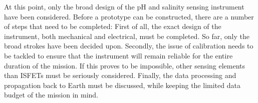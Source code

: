 \noindent
At this point, only the broad design of the pH and salinity sensing instrument have been considered. Before a prototype can be constructed, there are a number of steps that need to be completed:
First of all, the exact design of the instrument, both mechanical and electrical, must be completed. So far, only the broad strokes have been decided upon. Secondly, the issue of calibration needs to be tackled to ensure that the instrument will remain reliable for the entire duration of the mission. If this proves to be impossible, other sensing elements than ISFETs must be seriously considered. Finally, the data processing and propagation back to Earth must be discussed, while keeping the limited data budget of the mission in mind.
